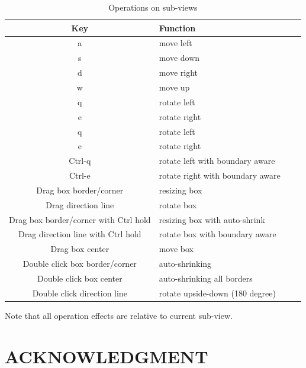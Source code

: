 \documentclass[letterpaper, 10 pt, conference]{ieeeconf}  %
\begin{document}
\begin{table}[h]
	\caption{Operations on sub-views}
	\label{table:keyboard_subview}
	\begin{center}
		\begin{tabular}{|c|l|c|l|}
			\hline
			\textbf{Key} & \textbf{Function}\\			
			\hline
			a & move left\\
			\hline
			s & move down\\
			\hline
			d & move right\\
			\hline
			w & move up\\
			\hline
			q & rotate left\\
			\hline
			e & rotate right\\
			\hline
			q & rotate left\\
			\hline
			e & rotate right\\
			\hline				
			Ctrl-q & rotate left with boundary aware\\
			\hline
			Ctrl-e & rotate right with boundary aware\\
			\hline
			Drag box border/corner & resizing box\\
			\hline
			Drag direction line & rotate box\\
			\hline
			Drag box border/corner with Ctrl hold & resizing box with auto-shrink\\
			\hline
			Drag direction line with Ctrl hold& rotate box with boundary aware\\
			\hline
			Drag box center & move box\\
			\hline
			Double click box border/corner & auto-shrinking\\
			\hline
			Double click box center & auto-shrinking all borders\\
			\hline
			Double click direction line& rotate upside-down (180 degree)\\
			\hline
		\end{tabular}
	
		 {\raggedright Note that all operation effects are relative to current sub-view.\par}
		 
	\end{center}
\end{table}
\section*{ACKNOWLEDGMENT}







\end{document}
